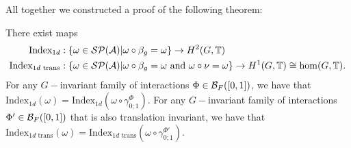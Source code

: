 \documentclass[12pt,a4paper,twoside]{article}
\numberwithin{equation}{section}
\begin{document}
All together we constructed a proof of the following theorem:
\begin{theorem}
	There exist maps
	\begin{align}
		\textrm{Index}_{1d}&:\{\omega\in\mathcal{S}\mathcal P(\mathcal A)|\omega\circ\beta_g=\omega\}\rightarrow H^2(G,\mathbb T)\\
		\textrm{Index}_{1d\text{ trans}}&:\{\omega\in\mathcal{S}\mathcal P(\mathcal A)|\omega\circ\beta_g=\omega\text{ and }\omega\circ\nu=\omega\}\rightarrow H^1(G,\mathbb T)\cong \hom(G,\mathbb T).
	\end{align}
	For any $G-$invariant family of interactions $\Phi\in\mathcal B_{F}([0,1])$, we have that $\textrm{Index}_{1d}(\omega)=\textrm{Index}_{1d}(\omega\circ\gamma^\Phi_{0;1})$. For any $G-$invariant family of interactions $\Phi'\in\mathcal B_{F}([0,1])$ that is also translation invariant, we have that $\textrm{Index}_{1d\text{ trans}}(\omega)=\textrm{Index}_{1d\text{ trans}}(\omega\circ\gamma^{\Phi'}_{0;1})$.
\end{theorem}
\end{document}
